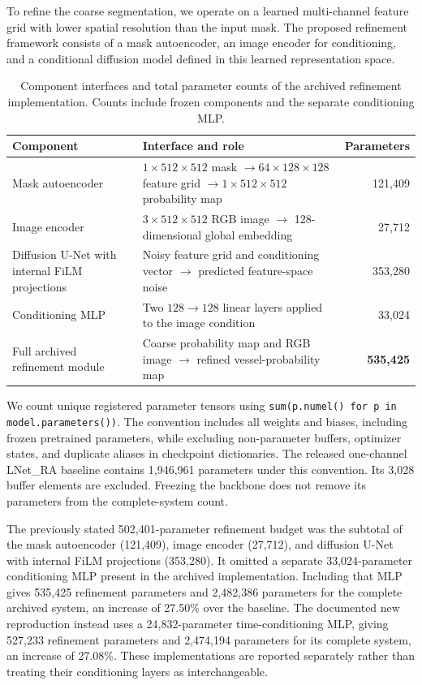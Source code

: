 \documentclass[jimaging,article,submit,pdftex,moreauthors]
  {Definitions/mdpi}
\begin{document}
To refine the coarse segmentation, we operate on a learned multi-channel feature grid with lower spatial resolution than the input mask. The proposed refinement framework consists of a mask autoencoder, an image encoder for conditioning, and a conditional diffusion model defined in this learned representation space.
\begin{table}[htbp]
\centering
\caption{Component interfaces and total parameter counts of the archived refinement implementation. Counts include frozen components and the separate conditioning MLP.}
\label{tab:architecture_params}
\small
\begin{tabularx}{\textwidth}{@{}p{}Xr@{}}
\toprule
Component & Interface and role & Parameters \\
\midrule
Mask autoencoder & $1\times512\times512$ mask $\rightarrow 64\times128\times128$ feature grid $\rightarrow 1\times512\times512$ probability map & 121,409 \\
Image encoder & $3\times512\times512$ RGB image $\rightarrow$ 128-dimensional global embedding & 27,712 \\
Diffusion U-Net with internal FiLM projections & Noisy feature grid and conditioning vector $\rightarrow$ predicted feature-space noise & 353,280 \\
Conditioning MLP & Two $128\rightarrow128$ linear layers applied to the image condition & 33,024 \\
\midrule
Full archived refinement module & Coarse probability map and RGB image $\rightarrow$ refined vessel-probability map & \textbf{535,425} \\
\bottomrule
\end{tabularx}
\end{table}
We count unique registered parameter tensors using \texttt{sum(p.numel() for p in model.parameters())}. The convention includes all weights and biases, including frozen pretrained parameters, while excluding non-parameter buffers, optimizer states, and duplicate aliases in checkpoint dictionaries. The released one-channel LNet\_RA baseline contains 1,946,961 parameters under this convention. Its 3,028 buffer elements are excluded. Freezing the backbone does not remove its parameters from the complete-system count.

The previously stated 502,401-parameter refinement budget was the subtotal of the mask autoencoder (121,409), image encoder (27,712), and diffusion U-Net with internal FiLM projections (353,280). It omitted a separate 33,024-parameter conditioning MLP present in the archived implementation. Including that MLP gives 535,425 refinement parameters and 2,482,386 parameters for the complete archived system, an increase of 27.50\% over the baseline. The documented new reproduction instead uses a 24,832-parameter time-conditioning MLP, giving 527,233 refinement parameters and 2,474,194 parameters for its complete system, an increase of 27.08\%. These implementations are reported separately rather than treating their conditioning layers as interchangeable.
\end{document}
